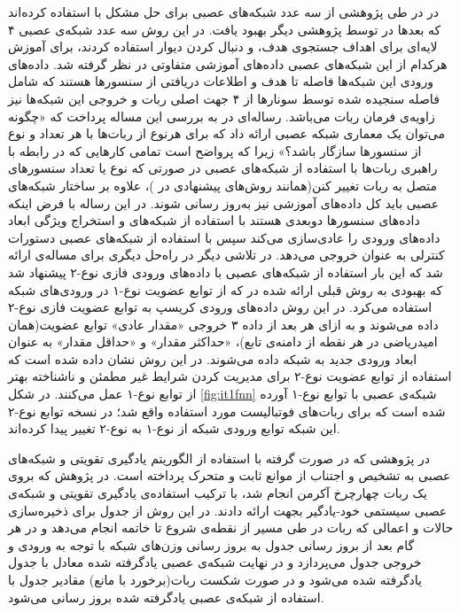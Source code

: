 در  در طی پژوهشی از سه عدد شبکه‌های عصبی برای حل مشکل  با استفاده کرده‌اند که بعدها در  توسط پژوهشی دیگر بهبود یافت. در این روش سه عدد شبکه‌ی عصبی ۴ لایه‌ای برای اهداف جستجوی هدف،  و دنبال کردن دیوار استفاده کردند، برای آموزش هرکدام از این شبکه‌های عصبی داده‌های آموزشی متفاوتی در نظر گرفته شد. داده‌های ورودی این شبکه‌ها فاصله تا هدف و اطلاعات دریافتی از سنسورها هستند که شامل فاصله سنجیده شده توسط سونارها از ۴ جهت اصلی ربات و خروجی این شبکه‌ها نیز زاویه‌ی فرمان ربات می‌باشد.
رساله‌ای در  به بررسی این مساله پرداخت که «چگونه می‌توان یک معماری شبکه عصبی ارائه داد که برای هرنوع از ربات‌ها با هر تعداد و نوع از سنسورها سازگار باشد؟» زیرا که پرواضح است تمامی کارهایی که در رابطه با راهبری ربات‌ها با استفاده از شبکه‌های عصبی در صورتی که نوع یا تعداد سنسورهای متصل به ربات تغییر کنن(همانند روش‌های پیشنهادی در )، علاوه بر ساختار شبکه‌های عصبی باید کل داده‌های آموزشی نیز به‌روز رسانی شوند. در این رساله با فرض اینکه داده‌های سنسورها دوبعدی هستند با استفاده از شبکه‌های  و استخراج ویژگی  ابعاد داده‌های ورودی را عادی‌سازی می‌کند سپس با استفاده از شبکه‌های عصبی دستورات کنترلی به عنوان خروجی می‌دهد.
در تلاشی دیگر در  راه‌حل دیگری برای مساله‌ی  ارائه شد که این بار استفاده‌ از شبکه‌های عصبی با داده‌های ورودی فازی نوع-۲ پیشنهاد شد که بهبودی به روش قبلی ارائه شده در  که از توابع عضویت نوع-۱ در ورودی‌های شبکه استفاده می‌کرد. در این روش داده‌های ورودی کریسپ به توابع عضویت فازی نوع-۲ داده می‌شوند و به ازای هر بعد از داده ۳ خروجی «مقدار عادی» توابع عضویت(همان امیدریاضی در هر نقطه از دامنه‌ی تابع)، «حداکثر مقدار» و «حداقل مقدار» به عنوان ابعاد ورودی جدید به شبکه داده می‌شوند. در این روش نشان داده شده است که استفاده از توابع عضویت نوع-۲ برای مدیریت کردن شرایط غیر مطمئن و ناشناخته بهتر از توابع نوع-۱ عمل می‌کنند. در شکل \ref{fig:it1fnn} شبکه‌ی عصبی با توابع نوع-۱ آورده شده است که برای ربات‌های فوتبالیست مورد استفاده واقع شد؛ در نسخه توابع نوع-۲ این شبکه توابع ورودی شبکه از نوع-۱ به نوع-۲ تغییر پیدا کرده‌اند.


در پژوهشی که در  صورت گرفته با استفاده از الگوریتم یادگیری تقویتی  و شبکه‌های عصبی به تشخیص و اجتناب از موانع ثابت و متحرک پرداخته است. در پژوهش که بروی یک ربات چهارچرخ آکرمن انجام شد، با ترکیب استفاده‌ی یادگیری تقویتی و شبکه‌ی عصبی سیستمی خود-یادگیر بجهت  ارائه دادند. در این روش از جدول  برای ذخیره‌سازی حالات و اعمالی که ربات در طی مسیر از نقطه‌ی شروع تا خاتمه انجام می‌دهد و در هر گام بعد از بروز رسانی جدول  به بروز رسانی وزن‌های شبکه با توجه به ورودی و خروجی جدول  می‌پردازد و در نهایت شبکه‌ی عصبی یادگرفته شده معادل با جدول یادگرفته شده  می‌شود و در صورت شکست ربات(برخورد با مانع) مقادیر جدول  با استفاده از شبکه‌ی عصبی یادگرفته شده بروز رسانی می‌شود.